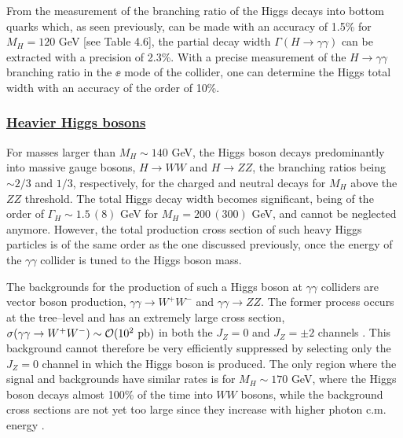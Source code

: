 \begin{figure}[thb]
\vspace*{-.2cm}
\end{figure}

From the measurement of the branching ratio of the Higgs decays into bottom
quarks which, as seen previously, can be made with an accuracy of 1.5\%
for $M_H=120$ GeV [see Table 4.6], the partial decay width $\Gamma (H \to
\gamma \gamma)$ can be extracted with a precision of 2.3\%. With a precise
measurement of the $H\to \gamma \gamma$ branching ratio in the $\ee$ mode
of the collider, one can determine the Higgs total width with an accuracy of 
the order of 10\%. 
 
\subsubsection*{\underline{Heavier Higgs bosons}}

For masses larger than $M_H \sim 140$ GeV, the Higgs boson decays 
predominantly into massive gauge bosons, $H \to WW$ and $H\to ZZ$,  
the branching ratios being $\sim 2/3$ and $1/3$, respectively, for the
charged and  neutral decays for $M_H$ above the $ZZ$ threshold. The total
Higgs decay width becomes significant, being of the order of $\Gamma_H \sim 
1.5\,(8)$ GeV for $M_H=200\, (300)$ GeV, and cannot be neglected anymore. 
However, the total production cross section of such heavy Higgs particles 
is of the same order as the one discussed previously, once the energy of 
the $\gamma \gamma$ collider is tuned to the Higgs boson mass. \s

The backgrounds for the production of such a Higgs boson at $\gamma \gamma$
colliders are vector boson production, $\gamma \gamma \to W^+ W^-$ and $\gamma
\gamma \to ZZ$. The former process occurs at the tree--level and has an
extremely large cross section, $\sigma(\gamma \gamma \to W^+W^-) \sim {\cal
O}(10^2~{\rm pb})$ in both the $J_Z=0$ and $J_Z=\pm 2$ channels
\cite{gam-WW,Othergam-WW}. This background cannot therefore be very efficiently
suppressed by  selecting only the $J_Z=0$ channel in which the Higgs boson is
produced. The only region where the signal and backgrounds have similar rates
is for $M_H \sim 170$ GeV, where the Higgs boson decays almost 100\% of the
time into $WW$ bosons, while the background cross sections are not yet too
large since they increase with higher photon c.m. energy \cite{gam-HWW}. \s

